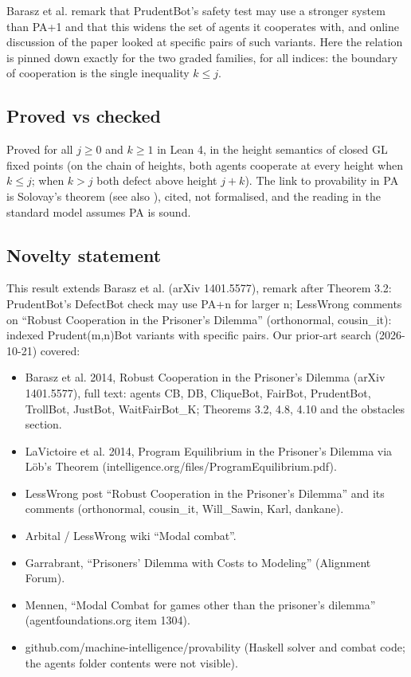 \documentclass{article}
\begin{document}
Barasz et al. remark that PrudentBot's safety test may use a stronger system than PA+1 and
that this widens the set of agents it cooperates with, and online discussion of the paper
looked at specific pairs of such variants. Here the relation is pinned down exactly for the
two graded families, for all indices: the boundary of cooperation is the single inequality
$k \le j$.

\subsection*{Proved vs checked}

Proved for all $j \ge 0$ and $k \ge 1$ in Lean 4, in the height semantics of closed GL fixed
points (on the chain of heights, both agents cooperate at every height when $k \le j$; when
$k > j$ both defect above height $j + k$). The link to provability in PA is Solovay's theorem
\cite{solovay1976provability} (see also \cite{boolos1993logic}), cited, not formalised, and the reading
in the standard model assumes PA is sound.

\subsection*{Novelty statement}

This result extends Barasz et al. (arXiv 1401.5577), remark after Theorem 3.2: PrudentBot's DefectBot check may use PA+n for larger n; LessWrong comments on ``Robust Cooperation in the Prisoner's Dilemma'' (orthonormal, cousin\_it): indexed Prudent(m,n)Bot variants with specific pairs. Our prior-art search (2026-10-21) covered:

\begin{itemize}
\item Barasz et al. 2014, Robust Cooperation in the Prisoner's Dilemma (arXiv 1401.5577), full text: agents CB, DB, CliqueBot, FairBot, PrudentBot, TrollBot, JustBot, WaitFairBot\_K; Theorems 3.2, 4.8, 4.10 and the obstacles section.
\item LaVictoire et al. 2014, Program Equilibrium in the Prisoner's Dilemma via Löb's Theorem (intelligence.org/files/ProgramEquilibrium.pdf).
\item LessWrong post ``Robust Cooperation in the Prisoner's Dilemma'' and its comments (orthonormal, cousin\_it, Will\_Sawin, Karl, dankane).
\item Arbital / LessWrong wiki ``Modal combat''.
\item Garrabrant, ``Prisoners' Dilemma with Costs to Modeling'' (Alignment Forum).
\item Mennen, ``Modal Combat for games other than the prisoner's dilemma'' (agentfoundations.org item 1304).
\item github.com/machine-intelligence/provability (Haskell solver and combat code; the agents folder contents were not visible).
\end{itemize}
\end{document}
